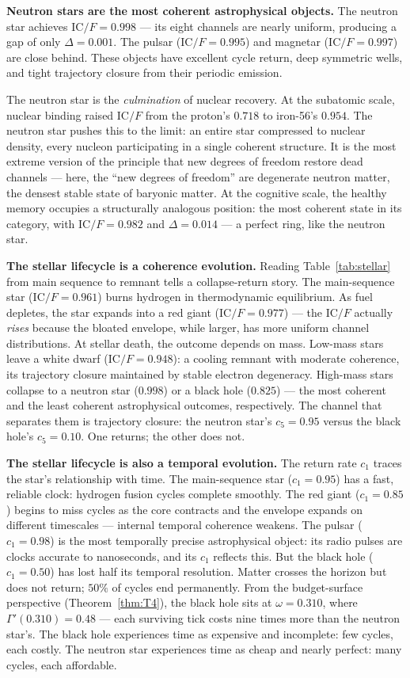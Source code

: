 \documentclass[
  aps,
  prd,
  twocolumn,
  superscriptaddress,
  nofootinbib,
  floatfix
]{revtex4-2}
\newcommand{\Gam}{\Gamma}
\newcommand{\IC}{\mathrm{IC}}
\begin{document}
\textbf{Neutron stars are the most coherent astrophysical
objects.}
The neutron star achieves $\IC/F = 0.998$ --- its eight
channels are nearly uniform, producing a gap of only
$\Delta = 0.001$.  The pulsar ($\IC/F = 0.995$) and magnetar
($\IC/F = 0.997$) are close behind.  These objects have
excellent cycle return, deep symmetric wells, and tight
trajectory closure from their periodic emission.

The neutron star is the \emph{culmination} of nuclear
recovery.  At the subatomic scale, nuclear binding raised
$\IC/F$ from the proton's $0.718$ to iron-56's $0.954$.
The neutron star pushes this to the limit: an entire star
compressed to nuclear density, every nucleon participating
in a single coherent structure.  It is the most extreme
version of the principle that new degrees of freedom restore
dead channels --- here, the ``new degrees of freedom'' are
degenerate neutron matter, the densest stable state of baryonic
matter.  At the cognitive scale, the healthy memory
occupies a structurally analogous position: the most
coherent state in its category, with $\IC/F = 0.982$ and
$\Delta = 0.014$ --- a perfect ring, like the neutron star.

\textbf{The stellar lifecycle is a coherence evolution.}
Reading Table~\ref{tab:stellar} from main sequence to
remnant tells a collapse-return story.  The main-sequence
star ($\IC/F = 0.961$) burns hydrogen in thermodynamic
equilibrium.  As fuel depletes, the star expands into a
red giant ($\IC/F = 0.977$) --- the $\IC/F$ actually
\emph{rises} because the bloated envelope, while larger,
has more uniform channel distributions.
At stellar death, the outcome depends on mass.  Low-mass
stars leave a white dwarf ($\IC/F = 0.948$): a cooling
remnant with moderate coherence, its trajectory closure
maintained by stable electron degeneracy.  High-mass stars
collapse to a neutron star ($0.998$) or a black hole
($0.825$) --- the most coherent and the least coherent
astrophysical outcomes, respectively.  The channel that
separates them is trajectory closure: the neutron star's
$c_5 = 0.95$ versus the black hole's $c_5 = 0.10$.  One
returns; the other does not.

\textbf{The stellar lifecycle is also a temporal evolution.}
The return rate $c_1$ traces the star's relationship with
time.  The main-sequence star ($c_1 = 0.95$) has a fast,
reliable clock: hydrogen fusion cycles complete smoothly.
The red giant ($c_1 = 0.85$) begins to miss cycles as the
core contracts and the envelope expands on different
timescales --- internal temporal coherence weakens.  The
pulsar ($c_1 = 0.98$) is the most temporally precise
astrophysical object: its radio pulses are clocks accurate
to nanoseconds, and its $c_1$ reflects this.  But the
black hole ($c_1 = 0.50$) has lost half its temporal
resolution.  Matter crosses the horizon but does not
return; $50\%$ of cycles end permanently.  From the
budget-surface perspective (Theorem~\ref{thm:T4}), the
black hole sits at $\omega = 0.310$, where $\Gam'(0.310) =
0.48$ --- each surviving tick costs nine times more than
the neutron star's.  The black hole experiences time as
expensive and incomplete: few cycles, each costly.  The
neutron star experiences time as cheap and nearly perfect:
many cycles, each affordable.
\end{document}
